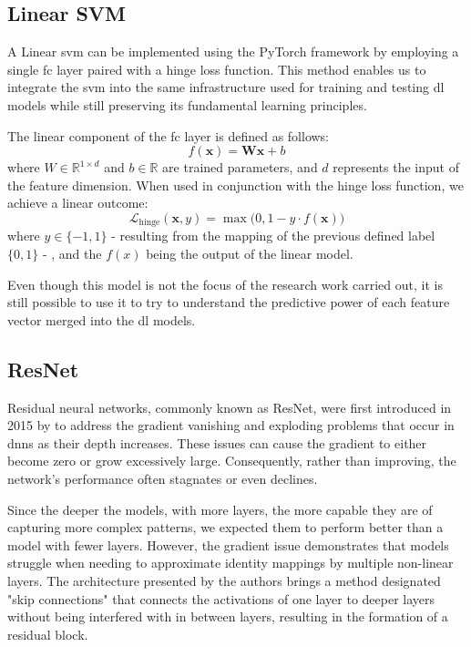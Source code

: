 \subsection{Linear SVM}
A Linear \acf{svm} can be implemented using the PyTorch framework by employing a single \ac{fc} layer paired with a hinge loss function. This method enables us to integrate the \ac{svm} into the same infrastructure used for training and testing \ac{dl} models while still preserving its fundamental learning principles.

The linear component of the \ac{fc} layer is defined as follows:
\begin{equation}
    f(\mathbf{x}) = \mathbf{W} \mathbf{x} + b
\end{equation}
where $W \in \mathbb{R}^{1\times d}$ and $b \in \mathbb{R}$ are trained parameters, and $d$ represents the input of the feature dimension. When used in conjunction with the hinge loss function, we achieve a linear outcome:
\begin{equation}
    \mathcal{L}_{\text{hinge}}(\mathbf{x}, y) = \max\big(0, 1 - y \cdot f(\mathbf{x})\big)
\end{equation}
where $y \in \{-1, 1\}$ - resulting from the mapping of the previous defined label $\{0, 1\}$ - ,  and the $f(x)$ being the output of the linear model.

Even though this model is not the focus of the research work carried out, it is still possible to use it to try to understand the predictive power of each feature vector merged into the \ac{dl} models.

\subsection{ResNet}
Residual neural networks, commonly known as ResNet, were first introduced in 2015 by \textcite{he_deep_2015} to address the gradient vanishing and exploding problems that occur in \acp{dnn} as their depth increases. These issues can cause the gradient to either become zero or grow excessively large. Consequently, rather than improving, the network's performance often stagnates or even declines.

Since the deeper the models, with more layers, the more capable they are of capturing more complex patterns, we expected them to perform better than a model with fewer layers.
However, the gradient issue demonstrates that models struggle when needing to approximate identity mappings by multiple non-linear layers.
The architecture presented by the authors brings a method designated "skip connections" that connects the activations of one layer to deeper layers without being interfered with in between layers, resulting in the formation of a residual block.

